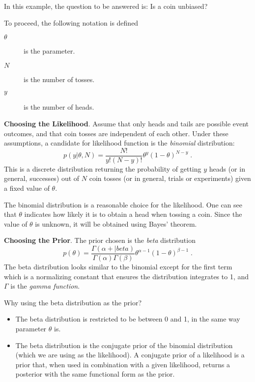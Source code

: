 \begin{example}
    In this example, the question to be answered is: Is a coin unbiased? 

    To proceed, the following notation is defined
    \begin{description}
        \item[$\theta$] is the parameter.
        \item[$N$] is the number of tosses.
        \item[$y$] is the number of heads. 
    \end{description}

    \textbf{Choosing the Likelihood}. Assume that only heads and tails are possible event outcomes, and that coin tosses are independent of each other. Under these assumptions, a candidate for likelihood function is the \emph{binomial} distribution:
    \begin{equation}
        p(y|\theta, N)=\dfrac{N!}{y!(N-y)!}\theta^y(1-\theta)^{N-y}\;.
    \end{equation}
    This is a discrete distribution returning the probability of getting $y$ heads 
    (or in general, successes) out of $N$ coin tosses (or in general, trials or experiments) 
    given a fixed value of $\theta$.

    The binomial distribution is a reasonable choice for the likelihood. One can see that $\theta$
    indicates how likely it is to obtain a head when tossing a coin. Since the value of $\theta$ is
    unknown, it will be obtained using Bayes' theorem.

    \textbf{Choosing the Prior}. The prior chosen is the \emph{beta} distribution
    \begin{equation}
        p(\theta)=\dfrac{\Gamma(\alpha+|beta)}{\Gamma(\alpha)\Gamma(\beta)}\theta^{\alpha-1}(1-\theta)^{\beta-1}\;.
    \end{equation}
    The beta distribution looks similar to the binomial except for the first term which is a normalizing constant that ensures the distribution integrates to 1, and $\Gamma$ is the \emph{gamma function}.

    Why using the beta distribution as the prior? 
    \begin{itemize}
        \item The beta distribution is restricted to be between 0 and 1, in the same way parameter $\theta$ is. 
        \item The beta distribution is the conjugate prior of the binomial distribution (which we are using as the likelihood). A conjugate prior of a likelihood is a prior that, when used in combination with a given likelihood, returns a posterior with the same functional form as the prior.
    \end{itemize}
    

\end{example}
